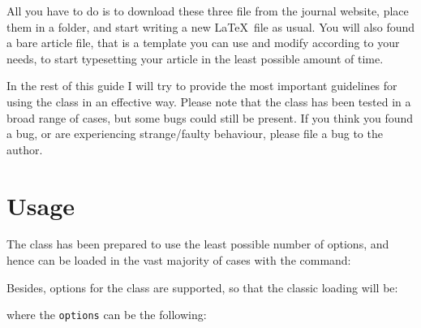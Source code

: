 \documentclass[11pt,onecolumn,notitlepage]{article}
\begin{document}
\medskip

All you have to do is to download these three file from the journal website, place them in a folder, and start writing a new \LaTeX\ file as usual. 
You will also found a bare article file, that is a template you can use and modify according to your needs, to start typesetting your article in the least possible amount of time.

In the rest of this guide I will try to provide the most important guidelines for using the class in an effective way.
Please note that the class has been tested in a broad range of cases, but some bugs could still be present. 
If you think you found a bug, or are experiencing strange/faulty behaviour, please file a bug to the author.

\bigskip

\noindent{}



\section{Usage}\label{sec:usage}

The class has been prepared to use the least possible number of options, and hence can be loaded in the vast majority of cases with the command:
\medskip

\medskip

Besides, options for the class are supported, so that the classic loading will be:
\medskip



\medskip\noindent where the \verb+options+ can be the following:
\end{document}
